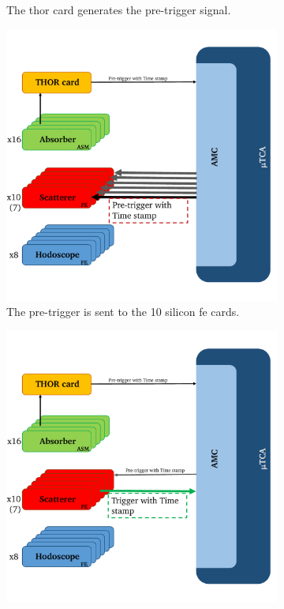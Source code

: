\begin{figure}
\begin{subfigure}[t]{0.5\textwidth}
\caption[Pre-trigger generation in the \gls{thor} card.]{The \gls{thor} card generates the pre-trigger signal.}
\label{chapappA::subfig::triggerLogic_2}
\end{subfigure}%
\newline
\begin{subfigure}[t]{0.5\textwidth}
 \centering
\includegraphics[width=0.9\linewidth]{03_GraphicFiles/appendixA_dataFormat/triggerLogic_3.pdf}
\caption[Pre-trigger sent to the 10 silicon \gls{fe} cards.]{The pre-trigger is sent to the 10 silicon \gls{fe} cards.}
\label{chapappA::subfig::triggerLogic_3}
\end{subfigure}%
\begin{subfigure}[t]{0.5\textwidth}
 \centering
\includegraphics[width=0.9\linewidth]{03_GraphicFiles/appendixA_dataFormat/triggerLogic_4.pdf}

\end{subfigure}
\end{figure}
